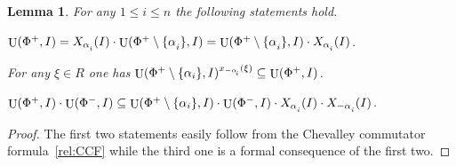 \documentclass[oneside, 12pt]{amsart}
\theoremstyle{plain}
\numberwithin{equation}{section}
\newtheorem{lemma}{Lemma}
\numberwithin{lemma}{section}
\theoremstyle{definition}
\theoremstyle{remark}
\DeclareMathOperator{\U}{U}
\def\ssub#1{\mathchoice
   {_{\lower2pt\hbox{$\scriptstyle #1$}}}
   {_{\lower2pt\hbox{$\scriptstyle #1$}}}
   {_{\lower1.5pt\hbox{$\scriptscriptstyle #1$}}}
   {_{\!\lower1.5pt\hbox{$\scriptscriptstyle #1$}}}}
\begin{document}
\begin{lemma}\label{lemma:dv_unipotent} For any $1\leq i\leq n$ the following statements hold. 
\begin{thmlist} \item \label{item-dvu1} $\U(\Phi^+, I) = X_{\alpha\ssub{i}}(I)\cdot \U(\Phi^+\setminus\{\alpha\ssub{i}\}, I) = \U(\Phi^+\setminus\{\alpha\ssub{i}\}, I)\cdot X_{\alpha\ssub{i}}(I)$.
\item \label{item-dvu2} For any $\xi\in R$ one has $\U(\Phi^+\setminus\{\alpha_i\}, I)^{x_{-\alpha\ssub{i}}(\xi)} \subseteq \U(\Phi^+, I)$.
\item \label{item-dvu3} $\U(\Phi^+, I)\cdot \U(\Phi^-, I) \subseteq \U(\Phi^+\setminus \{\alpha_i\}, I) \cdot \U(\Phi^-, I) \cdot X_{\alpha\ssub{i}}(I) \cdot X_{-\alpha\ssub{i}}(I)$.
\end{thmlist} \end{lemma}
\begin{proof} The first two statements easily follow from the Chevalley commutator formula~\eqref{rel:CCF} while the third one is a formal consequence of the first two. \end{proof}
\end{document}
